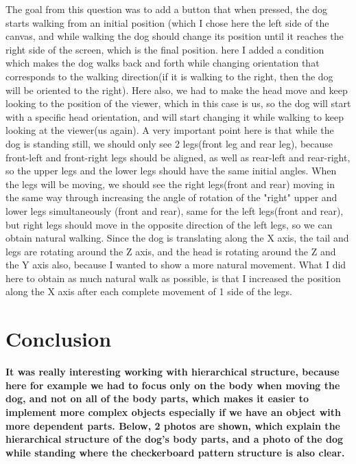 \documentclass{article}
\begin{document}
\begin{enumerate}
The goal from this question was to add a button that when pressed, the dog starts walking from an initial position (which I chose here the left side of the canvas, and while walking the dog should change its position until it reaches the right side of the screen, which is the final position. here I added a condition which makes the dog walks back and forth while changing orientation that corresponds to the walking direction(if it is walking to the right, then the dog will be oriented to the right). Here also, we had to make the head move and keep looking to the position of the viewer, which in this case is us, so the dog will start with a specific head orientation, and will start changing it while walking to keep looking at the viewer(us again). A very important point here is that while the dog is standing still, we should only see 2 legs(front leg and rear leg), because front-left and front-right legs should be aligned, as well as rear-left and rear-right, so the upper legs and the lower legs should have the same initial angles. When the legs will be moving, we should see the right legs(front and rear) moving in the same way through increasing the angle of rotation of the "right" upper and lower legs simultaneously (front and rear), same for the left legs(front and rear), but right legs should move in the opposite direction of the left legs, so we can obtain natural walking. Since the dog is translating along the X axis, the tail and legs are rotating around the Z axis, and the head is rotating around the Z and the Y axis also, because I wanted to show a more natural movement. What I did here to obtain as much natural walk as possible, is that I increased the position along the X axis after each complete movement  of 1 side of the legs.



\section {Conclusion}
\textbf{It was really interesting working with hierarchical structure, because here for example we had to focus only on the body when moving the dog, and not on all of the body parts, which makes it easier to implement more complex objects especially if we have an object with more dependent parts. Below, 2 photos are shown, which explain the hierarchical structure of the dog's body parts, and a photo of the dog while standing where the checkerboard pattern structure is also clear.}








\end{enumerate}
\end{document}
